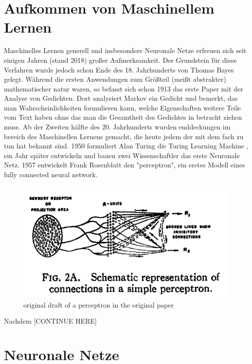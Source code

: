 \documentclass{thesisclass}
\begin{document}
\section{Aufkommen von Maschinellem Lernen}
Maschinelles Lernen generell und insbesondere Neuronale Netze erfreuen sich seit einigen Jahren (stand 2018) großer Aufmerksamkeit. Der Grundstein für diese Verfahren wurde jedoch schon Ende des 18. Jahrhunderts von Thomas Bayes gelegt\cite{bayes1763essay}. \newline
Während die ersten Anwendungen zum Größteil (meißt abstrakter) mathematischer natur waren\cite{legendre1805nouvelles}, so befasst sich schon 1913 das erste Paper mit der Analyse von Gedichten\cite{markov2006example}. Dort analysiert Markov ein Gedicht und bemerkt, das man Wahrscheinlichkeiten formulieren kann, welche Eigenschaften weitere Teile vom Text haben ohne das man die Gesamtheit des Gedichtes in betracht ziehen muss. \newline
Ab der Zweiten hälfte des 20. Jahrhunderts wurden enddeckungen im bereich des Maschinellen Lernens gemacht, die heute jedem der mit dem fach zu tun hat bekannt sind. 1950 formuliert Alan Turing die Turing Learning Machine \cite{machinery1950computing}, ein Jahr später entwickeln und bauen zwei Wissenschaftler das erste Neuronale Netz\cite{snarc}. 1957 entwickelt Frank Rosenblatt den "perceptron"\cite{rosenblatt1958perceptron}, ein erstes Modell eines fully connected neural network.
\begin{figure}[H]
  \center
  \includegraphics[width=\textwidth]{images/perceptron.png}
  \caption{original draft of a perceptron in the original paper}
  \label{fig:perceptron}
\end{figure}
Nachdem [CONTINUE HERE]

\section{Neuronale Netze}
\end{document}
